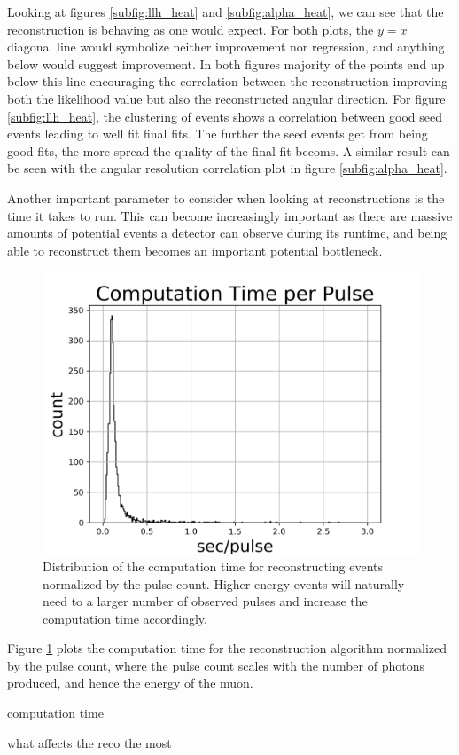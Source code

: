 Looking at figures \ref{subfig:llh_heat} and \ref{subfig:alpha_heat}, we can see that the reconstruction is behaving as one would expect. For both plots, the $y=x$ diagonal line would symbolize neither improvement nor regression, and anything below would suggest improvement. In both figures majority of the points end up below this line encouraging the correlation between the reconstruction improving both the likelihood value but also the reconstructed angular direction. For figure \ref{subfig:llh_heat}, the clustering of events shows a correlation between good seed events leading to well fit final fits. The further the seed events get from being good fits, the more spread the quality of the final fit becoms. A similar result can be seen with the angular resolution correlation plot in figure \ref{subfig:alpha_heat}.

Another important parameter to consider when looking at reconstructions is the time it takes to run. This can become increasingly important as there are massive amounts of potential events a detector can observe during its runtime, and being able to reconstruct them becomes an important potential bottleneck. 

\begin{figure}[H]
  \centering
  \includegraphics[width=12cm]{./Figures/reco_plots/computation_time_perpulse.png}
  \caption{Distribution of the computation time for reconstructing events normalized by the pulse count. Higher energy events will naturally need to a larger number of observed pulses and increase the computation time accordingly. }
  \label{fig:comp_time}
\end{figure}

Figure \ref{fig:comp_time} plots the computation time for the reconstruction algorithm normalized by the pulse count, where the pulse count scales with the number of photons produced, and hence the energy of the muon.


computation time

what affects the reco the most


